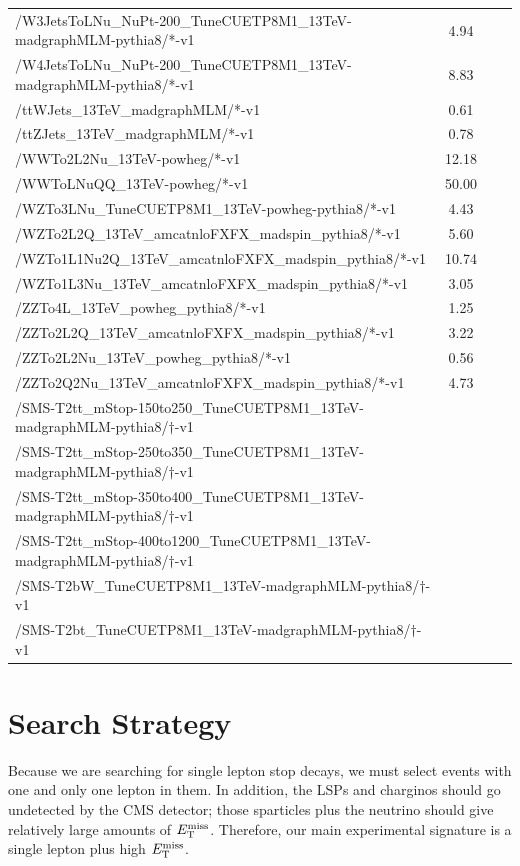 \begin{table}[htp]
{\begin{tabular}{|l|c|c|c|}
/W3JetsToLNu\_NuPt-200\_TuneCUETP8M1\_13TeV-madgraphMLM-pythia8/*-v1 & 4.94 \\
/W4JetsToLNu\_NuPt-200\_TuneCUETP8M1\_13TeV-madgraphMLM-pythia8/*-v1 & 8.83 \\
/ttWJets\_13TeV\_madgraphMLM/*-v1 & 0.61 \\
/ttZJets\_13TeV\_madgraphMLM/*-v1 & 0.78 \\
/WWTo2L2Nu\_13TeV-powheg/*-v1 & 12.18 \\
/WWToLNuQQ\_13TeV-powheg/*-v1 & 50.00  \\
/WZTo3LNu\_TuneCUETP8M1\_13TeV-powheg-pythia8/*-v1 & 4.43 \\
/WZTo2L2Q\_13TeV\_amcatnloFXFX\_madspin\_pythia8/*-v1 & 5.60 \\
/WZTo1L1Nu2Q\_13TeV\_amcatnloFXFX\_madspin\_pythia8/*-v1 & 10.74 \\
/WZTo1L3Nu\_13TeV\_amcatnloFXFX\_madspin\_pythia8/*-v1 & 3.05 \\
/ZZTo4L\_13TeV\_powheg\_pythia8/*-v1 & 1.25 \\
/ZZTo2L2Q\_13TeV\_amcatnloFXFX\_madspin\_pythia8/*-v1 & 3.22 \\
/ZZTo2L2Nu\_13TeV\_powheg\_pythia8/*-v1 & 0.56 \\
/ZZTo2Q2Nu\_13TeV\_amcatnloFXFX\_madspin\_pythia8/*-v1 & 4.73 \\
/SMS-T2tt\_mStop-150to250\_TuneCUETP8M1\_13TeV-madgraphMLM-pythia8/$\dagger$-v1 & \\
/SMS-T2tt\_mStop-250to350\_TuneCUETP8M1\_13TeV-madgraphMLM-pythia8/$\dagger$-v1 & \\
/SMS-T2tt\_mStop-350to400\_TuneCUETP8M1\_13TeV-madgraphMLM-pythia8/$\dagger$-v1 & \\
/SMS-T2tt\_mStop-400to1200\_TuneCUETP8M1\_13TeV-madgraphMLM-pythia8/$\dagger$-v1 & \\
/SMS-T2bW\_TuneCUETP8M1\_13TeV-madgraphMLM-pythia8/$\dagger$-v1 & \\
/SMS-T2bt\_TuneCUETP8M1\_13TeV-madgraphMLM-pythia8/$\dagger$-v1 & \\
\hline
\end{tabular}
}
\end{table}

\section{Search Strategy}
\label{sec:stop:searchstrategy}

Because we are searching for single lepton stop decays, we must select
events with one and only one lepton in them. In addition, the LSPs and
charginos should go undetected by the CMS detector; those sparticles
plus the neutrino should give relatively
large amounts of $E_\text{T}^\text{miss}$. Therefore, our main experimental signature is a
single lepton plus high $E_\text{T}^\text{miss}$.

